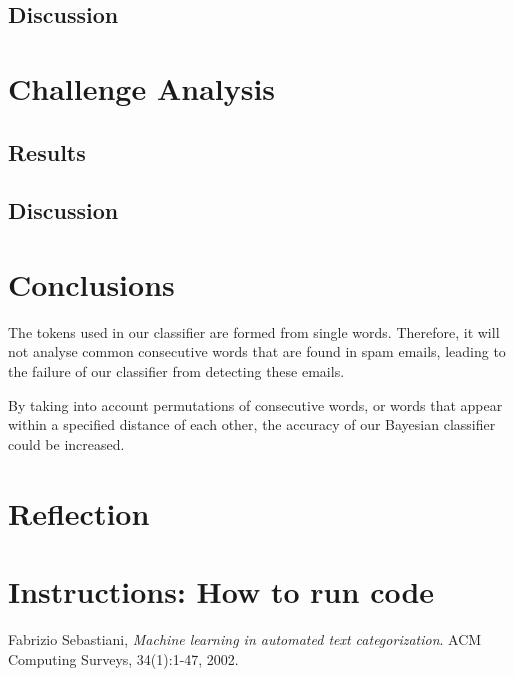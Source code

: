 \documentclass[10pt, a4paper]{article}
\begin{document}
\subsection{Discussion}

%

\section{Challenge Analysis}


\subsection{Results}

\subsection{Discussion}

\section{Conclusions}

The tokens used in our classifier are formed from single words. Therefore, it will not analyse common consecutive words that are found in spam emails, leading to the failure of our classifier from detecting these emails.

By taking into account permutations of consecutive words, or words that appear within a specified distance of each other, the accuracy of our Bayesian classifier could be increased.

\section{Reflection}

\section{Instructions: How to run code}

\begin{thebibliography}{9}

  Fabrizio Sebastiani,
  \emph{Machine learning in automated text categorization}.
  ACM Computing Surveys,
  34(1):1-47,
  2002.

\end{thebibliography}
\end{document}
